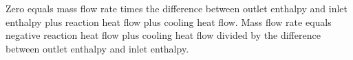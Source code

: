 Zero equals mass flow rate times the difference between outlet enthalpy and inlet enthalpy plus reaction heat flow plus cooling heat flow.  
Mass flow rate equals negative reaction heat flow plus cooling heat flow divided by the difference between outlet enthalpy and inlet enthalpy.